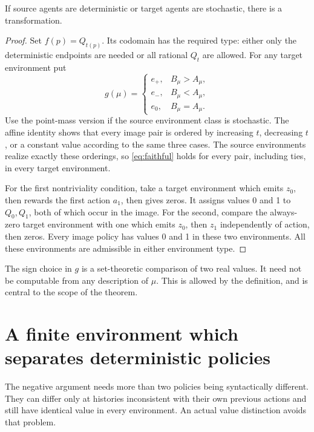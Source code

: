 \documentclass[11pt]{article}
\begin{document}
\begin{proposition}\label{prop:positive}
If source agents are deterministic or target agents are stochastic,
there is a transformation.
\end{proposition}
\begin{proof}
Set $f(p)=Q_{t(p)}$. Its codomain has the required type: either only
the deterministic endpoints are needed or all rational $Q_t$ are
allowed. For any target environment put
\[
 g(\mu)=
 \begin{cases}
 e_+,&B_\mu>A_\mu,\\
 e_-,&B_\mu<A_\mu,\\
 e_0,&B_\mu=A_\mu.
 \end{cases}
\]
Use the point-mass version if the source environment class is stochastic.
The affine identity shows that every image pair is ordered by increasing
$t$, decreasing $t$, or a constant value according to the same three
cases. The source environments realize exactly these orderings, so
\eqref{eq:faithful} holds for every pair, including ties, in every target
environment.

For the first nontriviality condition, take a target environment which
emits $z_0$, then rewards the first action $a_1$, then gives zeros.
It assigns values 0 and 1 to $Q_0,Q_1$, both of which occur in the
image. For the second, compare the always-zero target environment
with one which emits $z_0$, then $z_1$ independently of action, then
zeros. Every image policy has values 0 and 1 in these two environments.
All these environments are admissible in either environment type.
\end{proof}

The sign choice in $g$ is a set-theoretic comparison of two real values.
It need not be computable from any description of $\mu$. This is
allowed by the definition, and is central to the scope of the theorem.

\section{A finite environment which separates deterministic policies}

The negative argument needs more than two policies being syntactically
different. They can differ only at histories inconsistent with their
own previous actions and still have identical value in every environment.
An actual value distinction avoids that problem.
\end{document}
